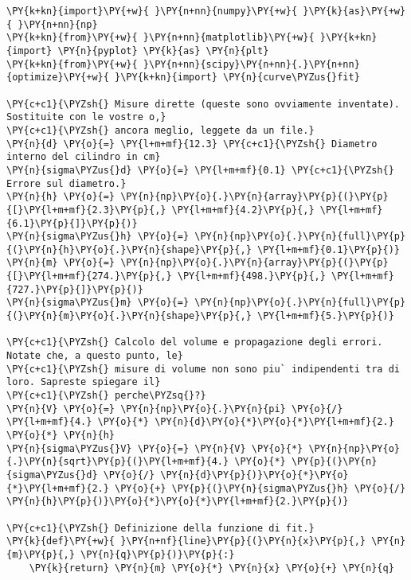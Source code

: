 \begin{Verbatim}[label=\makebox{\href{https://github.com/unipi-physics-labs/lab1-sheets/tree/main/snippy/dad_densita.py}{https://github.com/.../dad\_densita.py}},commandchars=\\\{\}]
\PY{k+kn}{import}\PY{+w}{ }\PY{n+nn}{numpy}\PY{+w}{ }\PY{k}{as}\PY{+w}{ }\PY{n+nn}{np}
\PY{k+kn}{from}\PY{+w}{ }\PY{n+nn}{matplotlib}\PY{+w}{ }\PY{k+kn}{import} \PY{n}{pyplot} \PY{k}{as} \PY{n}{plt}
\PY{k+kn}{from}\PY{+w}{ }\PY{n+nn}{scipy}\PY{n+nn}{.}\PY{n+nn}{optimize}\PY{+w}{ }\PY{k+kn}{import} \PY{n}{curve\PYZus{}fit}

\PY{c+c1}{\PYZsh{} Misure dirette (queste sono ovviamente inventate). Sostituite con le vostre o,}
\PY{c+c1}{\PYZsh{} ancora meglio, leggete da un file.}
\PY{n}{d} \PY{o}{=} \PY{l+m+mf}{12.3} \PY{c+c1}{\PYZsh{} Diametro interno del cilindro in cm}
\PY{n}{sigma\PYZus{}d} \PY{o}{=} \PY{l+m+mf}{0.1} \PY{c+c1}{\PYZsh{} Errore sul diametro.}
\PY{n}{h} \PY{o}{=} \PY{n}{np}\PY{o}{.}\PY{n}{array}\PY{p}{(}\PY{p}{[}\PY{l+m+mf}{2.3}\PY{p}{,} \PY{l+m+mf}{4.2}\PY{p}{,} \PY{l+m+mf}{6.1}\PY{p}{]}\PY{p}{)}
\PY{n}{sigma\PYZus{}h} \PY{o}{=} \PY{n}{np}\PY{o}{.}\PY{n}{full}\PY{p}{(}\PY{n}{h}\PY{o}{.}\PY{n}{shape}\PY{p}{,} \PY{l+m+mf}{0.1}\PY{p}{)}
\PY{n}{m} \PY{o}{=} \PY{n}{np}\PY{o}{.}\PY{n}{array}\PY{p}{(}\PY{p}{[}\PY{l+m+mf}{274.}\PY{p}{,} \PY{l+m+mf}{498.}\PY{p}{,} \PY{l+m+mf}{727.}\PY{p}{]}\PY{p}{)}
\PY{n}{sigma\PYZus{}m} \PY{o}{=} \PY{n}{np}\PY{o}{.}\PY{n}{full}\PY{p}{(}\PY{n}{m}\PY{o}{.}\PY{n}{shape}\PY{p}{,} \PY{l+m+mf}{5.}\PY{p}{)}

\PY{c+c1}{\PYZsh{} Calcolo del volume e propagazione degli errori. Notate che, a questo punto, le}
\PY{c+c1}{\PYZsh{} misure di volume non sono piu` indipendenti tra di loro. Sapreste spiegare il}
\PY{c+c1}{\PYZsh{} perche\PYZsq{}?}
\PY{n}{V} \PY{o}{=} \PY{n}{np}\PY{o}{.}\PY{n}{pi} \PY{o}{/} \PY{l+m+mf}{4.} \PY{o}{*} \PY{n}{d}\PY{o}{*}\PY{o}{*}\PY{l+m+mf}{2.} \PY{o}{*} \PY{n}{h}
\PY{n}{sigma\PYZus{}V} \PY{o}{=} \PY{n}{V} \PY{o}{*} \PY{n}{np}\PY{o}{.}\PY{n}{sqrt}\PY{p}{(}\PY{l+m+mf}{4.} \PY{o}{*} \PY{p}{(}\PY{n}{sigma\PYZus{}d} \PY{o}{/} \PY{n}{d}\PY{p}{)}\PY{o}{*}\PY{o}{*}\PY{l+m+mf}{2.} \PY{o}{+} \PY{p}{(}\PY{n}{sigma\PYZus{}h} \PY{o}{/} \PY{n}{h}\PY{p}{)}\PY{o}{*}\PY{o}{*}\PY{l+m+mf}{2.}\PY{p}{)}

\PY{c+c1}{\PYZsh{} Definizione della funzione di fit.}
\PY{k}{def}\PY{+w}{ }\PY{n+nf}{line}\PY{p}{(}\PY{n}{x}\PY{p}{,} \PY{n}{m}\PY{p}{,} \PY{n}{q}\PY{p}{)}\PY{p}{:}
    \PY{k}{return} \PY{n}{m} \PY{o}{*} \PY{n}{x} \PY{o}{+} \PY{n}{q}


\end{Verbatim}
